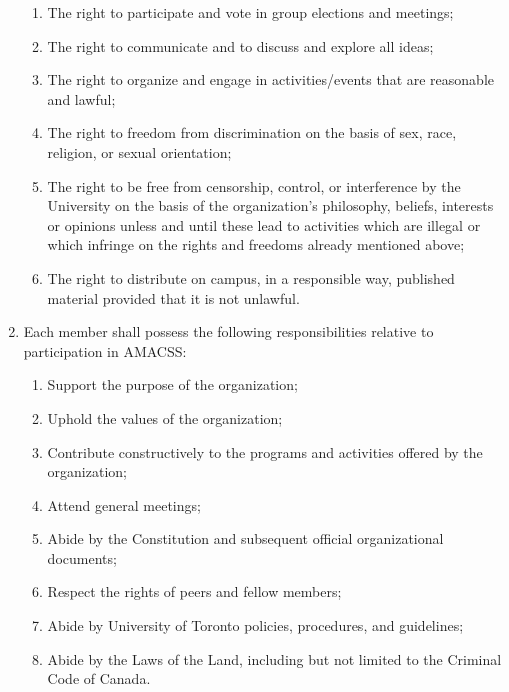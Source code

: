 \documentclass[12pt,a4paper]{article}
\begin{document}
\begin{enumerate}
\begin{enumerate}
\item The right to participate and vote in group elections and meetings;

\item The right to communicate and to discuss and explore all ideas;

\item The right to organize and engage in activities/events that are reasonable and lawful;

\item The right to freedom from discrimination on the basis of sex, race, religion, or sexual orientation;

\item The right to be free from censorship, control, or interference by the University on the basis of the organization's philosophy, beliefs, interests or opinions unless and until these lead to activities which are illegal or which infringe on the rights and freedoms already mentioned above;

\item The right to distribute on campus, in a responsible way, published material provided that it is not unlawful.
\end{enumerate}

\item Each member shall possess the following responsibilities relative to participation in AMACSS:

\begin{enumerate}
\item Support the purpose of the organization;

\item Uphold the values of the organization;

\item Contribute constructively to the programs and activities offered by the organization;

\item Attend general meetings;

\item Abide by the Constitution and subsequent official organizational documents;

\item Respect the rights of peers and fellow members;

\item Abide by University of Toronto policies, procedures, and guidelines;

\item Abide by the Laws of the Land, including but not limited to the Criminal Code of Canada.
\end{enumerate}


\end{enumerate}
\end{document}
